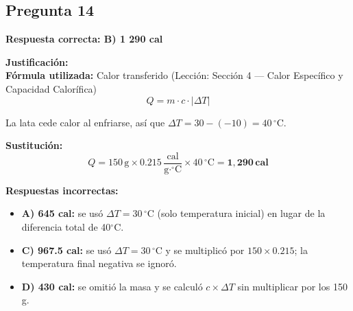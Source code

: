 \begin{respuestabox}
\subsection{Pregunta 14}
\textcolor{verdecorrecto}{\textbf{Respuesta correcta: B) 1 290 cal}}

\textbf{Justificación:}\\
\textbf{Fórmula utilizada:} Calor transferido (Lección: Sección 4 --- Calor Específico y Capacidad Calorífica)
$$Q = m \cdot c \cdot |\Delta T|$$

La lata cede calor al enfriarse, así que $\Delta T = 30 - (-10) = 40\,^\circ$C.

\textbf{Sustitución:}
$$Q = 150\,\text{g} \times 0.215\,\frac{\text{cal}}{\text{g}\cdot^\circ\text{C}} \times 40\,^\circ\text{C} = \mathbf{1{,}290\,\text{cal}}$$

\textbf{Respuestas incorrectas:}
\begin{itemize}
    \item \textbf{A) 645 cal:} se usó $\Delta T = 30\,^\circ$C (solo temperatura inicial) en lugar de la diferencia total de 40$^\circ$C.
    \item \textbf{C) 967.5 cal:} se usó $\Delta T = 30\,^\circ$C y se multiplicó por $150 \times 0.215$; la temperatura final negativa se ignoró.
    \item \textbf{D) 430 cal:} se omitió la masa y se calculó $c \times \Delta T$ sin multiplicar por los 150 g.
\end{itemize}
\end{respuestabox}

